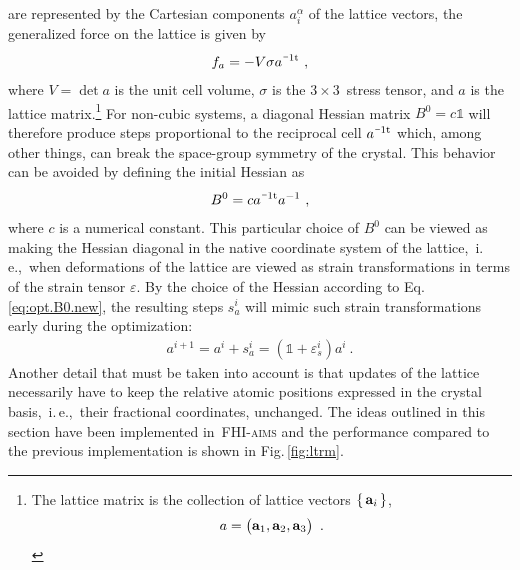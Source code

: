  are represented by the Cartesian components $a^\alpha_i$ of the lattice vectors, the generalized force on the lattice is given by
\begin{align}
f_a = - V \sigma \itp{a}~,
\end{align}
where $V = \det a$ is the unit cell volume, $\sigma$ is the $3 \times 3$~stress tensor, and $a$ is the lattice matrix.\footnote[][0em]{The lattice matrix is the collection of lattice vectors $\set{{\bf a}_i}$,
	\begin{align}
	a = \begin{pmatrix} {\bf a}_1, {\bf a}_2, {\bf a}_3 \end{pmatrix}~.
	\end{align}
}
For non-cubic systems, a diagonal Hessian matrix $B^0 = c \mathds 1$ will therefore produce steps proportional to the reciprocal cell $\itp{a}$ which, among other things, can break the space-group symmetry of the crystal. This behavior can be avoided by defining the initial Hessian as
\begin{align}
B^0 = c \itp{a} a^{-1}~,
\label{eq:opt.B0.new}
\end{align}
where $c$ is a numerical constant. This particular choice of $B^0$ can be viewed as making the Hessian diagonal in the native coordinate system of the lattice,~i.\,e.,~when deformations of the lattice are viewed as strain transformations in terms of the strain tensor $\varepsilon$. By the choice of the Hessian according to Eq.\,\eqref{eq:opt.B0.new}, the resulting steps $s^i_a$ will mimic such strain transformations early during the optimization:
\begin{align}
a^{i + 1} = a^i + s_a^i = (\mathds 1 + \varepsilon_s^i) a^i~.
\end{align}
Another detail that must be taken into account is that updates of the lattice necessarily have to keep the relative atomic positions expressed in the crystal basis,~i.\,e.,~their fractional coordinates, unchanged. The ideas outlined in this section have been implemented in~\textsc{FHI-aims} and the performance compared to the previous implementation is shown in Fig.\,\ref{fig:ltrm}.
